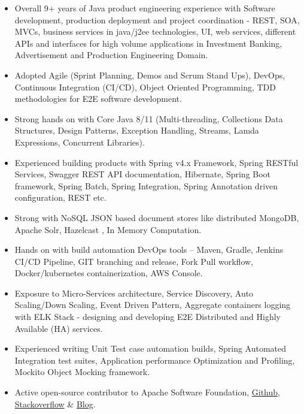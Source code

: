 \documentclass[10pt,A4]{article}
\begin{document}
\begin{itemize}
\item Overall 9+ years of Java product engineering experience with Software development, 
production deployment and project coordination - REST, SOA,
MVCs, business services in java/j2ee technologies, UI, web services, different APIs and
interfaces for high volume applications in Investment Banking, Advertisement and Production Engineering Domain.

\item Adopted Agile (Sprint Planning, Demos and Scrum Stand Ups), DevOps, Continuous Integration (CI/CD),
Object Oriented Programming, TDD methodologies for E2E software development.

\item Strong hands on with Core Java 8/11 (Multi-threading, Collections Data Structures, Design Patterns,
Exception Handling, Streams, Lamda Expressions, Concurrent Libraries).

\item Experienced building products with Spring v4.x Framework, Spring RESTful Services, 
Swagger REST API documentation, Hibernate, Spring Boot framework, Spring Batch, Spring Integration, 
Spring Annotation driven configuration, REST etc.

\item Strong with NoSQL JSON based document stores like distributed MongoDB, Apache Solr, Hazelcast , In Memory Computation.

\item Hands on with build automation DevOps tools – Maven, Gradle, Jenkins CI/CD Pipeline, GIT branching
and release, Fork Pull workflow, Docker/kubernetes containerization, AWS Console.

\item Exposure to Micro-Services architecture, Service Discovery, Auto Scaling/Down Scaling, Event Driven
Pattern, Aggregate containers logging with ELK Stack - designing and developing E2E Distributed and
Highly Available (HA) services.

\item Experienced writing Unit Test case automation builds, Spring Automated Integration test suites,
Application performance Optimization and Profiling, Mockito Object Mocking framework.

\item Active open-source contributor to Apache Software Foundation, \href{http://github.com/ameyjadiye/}{Github}, \href{https://stackoverflow.com/users/2664649/amey-jadiye}{Stackoverflow} \& \href{http://codeinventory.com}{Blog}.
\end{itemize} 
\end{document}
